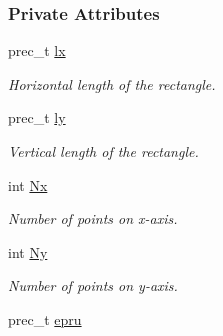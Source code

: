 \subsubsection*{Private Attributes}
\begin{CompactItemize}
\item 
\hypertarget{classRectangleKnots_43c17b8bdac8a15be6bda39589bbbcdf}{
prec\_\-t \hyperlink{classRectangleKnots_43c17b8bdac8a15be6bda39589bbbcdf}{lx}}
\label{classRectangleKnots_43c17b8bdac8a15be6bda39589bbbcdf}

\begin{CompactList}\small\item\em Horizontal length of the rectangle. \item\end{CompactList}\item 
\hypertarget{classRectangleKnots_ce44d644a2e13b542ac05d2fe34060b5}{
prec\_\-t \hyperlink{classRectangleKnots_ce44d644a2e13b542ac05d2fe34060b5}{ly}}
\label{classRectangleKnots_ce44d644a2e13b542ac05d2fe34060b5}

\begin{CompactList}\small\item\em Vertical length of the rectangle. \item\end{CompactList}\item 
\hypertarget{classRectangleKnots_c006ac567fdc1f8cf3a2a27180aaaa2d}{
int \hyperlink{classRectangleKnots_c006ac567fdc1f8cf3a2a27180aaaa2d}{Nx}}
\label{classRectangleKnots_c006ac567fdc1f8cf3a2a27180aaaa2d}

\begin{CompactList}\small\item\em Number of points on x-axis. \item\end{CompactList}\item 
\hypertarget{classRectangleKnots_4d40d7a0c85a14814b96db5358fda2da}{
int \hyperlink{classRectangleKnots_4d40d7a0c85a14814b96db5358fda2da}{Ny}}
\label{classRectangleKnots_4d40d7a0c85a14814b96db5358fda2da}

\begin{CompactList}\small\item\em Number of points on y-axis. \item\end{CompactList}\item 
\hypertarget{classRectangleKnots_7d12d4b36047bebe0c7627110f59491e}{
prec\_\-t \hyperlink{classRectangleKnots_7d12d4b36047bebe0c7627110f59491e}{epru}}
\label{classRectangleKnots_7d12d4b36047bebe0c7627110f59491e}


\end{CompactItemize}
